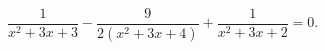\begin{ex}[type=equation]
	\begin{condition}
		$\dfrac{1}{x^2 + 3x + 3}- \dfrac{9}{2\left(x^2 + 3x +4\right)} + \dfrac{1}{x^2 + 3x + 2} = 0.$
	\end{condition}
\end{ex}